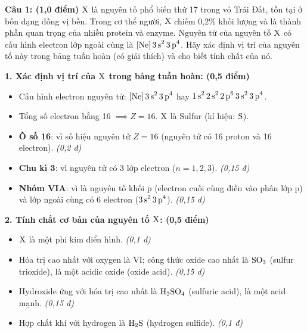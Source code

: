 \documentclass[11pt,a4paper]{article}
\begin{document}
\noindent
\textbf{Câu 1: (1,0 điểm)} $\ce{X}$ là nguyên tố phổ biến thứ 17 trong vỏ Trái Đất, tồn tại ở bốn dạng đồng vị bền. Trong cơ thể người, $\ce{X}$ chiếm 0,2\% khối lượng và là thành phần quan trọng của nhiều protein và enzyme. Nguyên tử của nguyên tố $\ce{X}$ có cấu hình electron lớp ngoài cùng là $\ce{[Ne] 3s^2 3p^4}$. Hãy xác định vị trí của nguyên tố này trong bảng tuần hoàn (có giải thích) và cho biết tính chất của nó.

\begin{tcolorbox}[colback=white,colframe=solBlue,title=\textbf{Lời giải chi tiết và Biểu điểm Câu 1:}]
\textbf{1. Xác định vị trí của $\ce{X}$ trong bảng tuần hoàn: (0,5 điểm)}
\begin{itemize}[leftmargin=1.2cm]
\item Cấu hình electron nguyên tử: $\ce{[Ne] 3s^2 3p^4}$ hay $\ce{1s^2 2s^2 2p^6 3s^2 3p^4}$.
\item Tổng số electron bằng 16 $\implies Z = 16$. $\ce{X}$ là Sulfur (kí hiệu: $\ce{S}$).
\item \textbf{Ô số 16}: vì số hiệu nguyên tử $Z = 16$ (nguyên tử có 16 proton và 16 electron). \hfill \textit{(0,2 đ)}
\item \textbf{Chu kì 3}: vì nguyên tử có 3 lớp electron ($n = 1, 2, 3$). \hfill \textit{(0,15 đ)}
\item \textbf{Nhóm VIA}: vì là nguyên tố khối p (electron cuối cùng điền vào phân lớp p) và lớp ngoài cùng có 6 electron ($\ce{3s^2 3p^4}$). \hfill \textit{(0,15 đ)}
\end{itemize}
\textbf{2. Tính chất cơ bản của nguyên tố $\ce{X}$: (0,5 điểm)}
\begin{itemize}[leftmargin=1.2cm]
\item $\ce{X}$ là một phi kim điển hình. \hfill \textit{(0,1 đ)}
\item Hóa trị cao nhất với oxygen là VI; công thức oxide cao nhất là $\ce{SO3}$ (sulfur trioxide), là một acidic oxide (oxide acid). \hfill \textit{(0,15 đ)}
\item Hydroxide ứng với hóa trị cao nhất là $\ce{H2SO4}$ (sulfuric acid), là một acid mạnh. \hfill \textit{(0,15 đ)}
\item Hợp chất khí với hydrogen là $\ce{H2S}$ (hydrogen sulfide). \hfill \textit{(0,1 đ)}
\end{itemize}
\end{tcolorbox}
\end{document}
